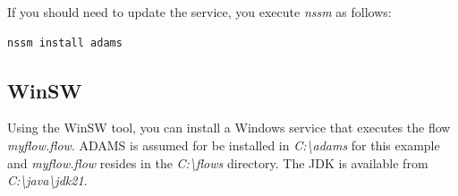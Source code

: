 \noindent If you should need to update the service, you execute \textit{nssm}
as follows:
\begin{verbatim}
nssm install adams
\end{verbatim}

\subsection{WinSW}
Using the WinSW\cite{winsw} tool, you can install a Windows service that executes the flow \textit{myflow.flow}.
ADAMS is assumed for be installed in \textit{C:\textbackslash adams} for this
example and \textit{myflow.flow} resides in the \textit{C:\textbackslash flows}
directory. The JDK is available from \textit{C:\textbackslash java\textbackslash jdk21}.


